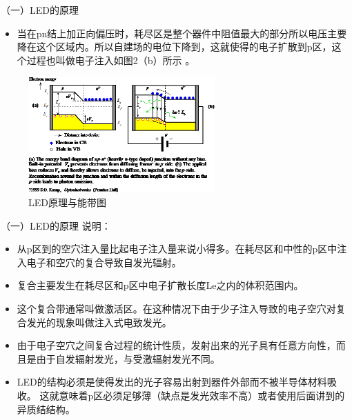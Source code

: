\documentclass[trans]{beamer} %
\begin{document}
 \begin{frame}{（一）LED的原理}

    \begin{itemize}
        \item  当在pn结上加正向偏压时，耗尽区是整个器件中阻值最大的部分所以电压主要降在这个区域内。所以自建场的电位下降到，这就使得的电子扩散到p区，这个过程也叫做电子注入如图2（b）所示 。 
    \end{itemize}
    \begin{figure}[htbp] 
    \centering\includegraphics[height=1.75in]{source/ch2/fg224.png} 
    \caption{LED原理与能带图}
    \end{figure}
 \end{frame}
\begin{frame}{（一）LED的原理}
说明：
    \begin{itemize}
        \item 从p区到的空穴注入量比起电子注入量来说小得多。在耗尽区和中性的p区中注入电子和空穴的复合导致自发光辐射。
        \item 复合主要发生在耗尽区和p区中电子扩散长度Le之内的体积范围内。
        \item 这个复合带通常叫做激活区。在这种情况下由于少子注入导致的电子空穴对复合发光的现象叫做注入式电致发光。
        \item 由于电子空穴之间复合过程的统计性质，发射出来的光子具有任意方向性，而且是由于自发辐射发光，与受激辐射发光不同。
\item LED的结构必须是使得发出的光子容易出射到器件外部而不被半导体材料吸收。
这就意味着p区必须足够薄（\alert{缺点是发光效率不高}）或者使用后面讲到的异质结结构。 

    \end{itemize}
 \end{frame}
 

\end{document}

